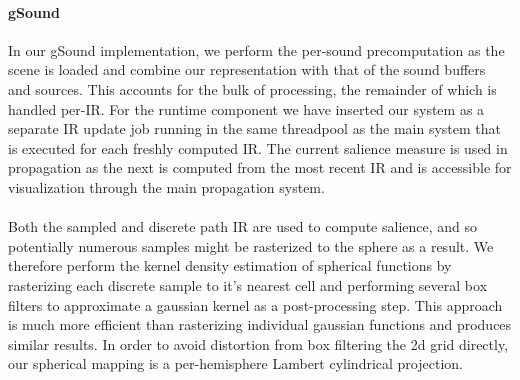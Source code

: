 \paragraph{gSound}
In our gSound implementation, we perform the per-sound precomputation as the scene is loaded and combine our 
representation with that of the sound buffers and sources.
This accounts for the bulk of processing, the remainder of which is handled per-IR.
For the runtime component we have inserted our system as a separate IR update job running in the same threadpool
as the main system that is executed for each freshly computed IR.
The current salience measure is used in propagation as the next is computed from the most recent IR and is accessible 
for visualization through the main propagation system.
\paragraph{}
Both the sampled and discrete path IR are used to compute salience, and so potentially numerous samples might be 
rasterized to the sphere as a result.
We therefore perform the kernel density estimation of spherical functions by rasterizing each discrete sample to it's 
nearest cell and performing several box filters to approximate a gaussian kernel as a post-processing step.
This approach is much more efficient than rasterizing individual gaussian functions and produces similar results.
In order to avoid distortion from box filtering the 2d grid directly, our spherical mapping is a per-hemisphere 
Lambert cylindrical projection.
